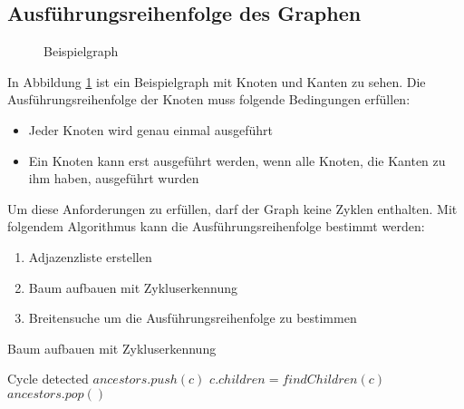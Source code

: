 \subsection{Ausführungsreihenfolge des Graphen}


\begin{figure}[H]
    \centering
    \caption{Beispielgraph}
    \label{fig:nodeExecutionOrder1}
\end{figure}

In Abbildung \ref{fig:nodeExecutionOrder1} ist ein Beispielgraph mit Knoten und Kanten zu sehen. Die Ausführungsreihenfolge der Knoten muss folgende Bedingungen erfüllen:
\begin{itemize}
    \item Jeder Knoten wird genau einmal ausgeführt
    \item Ein Knoten kann erst ausgeführt werden, wenn alle Knoten, die Kanten zu ihm haben, ausgeführt wurden
\end{itemize}

Um diese Anforderungen zu erfüllen, darf der Graph keine Zyklen enthalten. Mit folgendem Algorithmus kann die Ausführungsreihenfolge bestimmt werden:
\begin{enumerate}
    \item Adjazenzliste erstellen
    \item Baum aufbauen mit Zykluserkennung
    \item Breitensuche um die Ausführungsreihenfolge zu bestimmen 
\end{enumerate}

\begin{algorithm}[H]
    \caption{Baum aufbauen mit Zykluserkennung}
    \begin{algorithmic}[1]
                    \State Cycle detected
                \EndIf
                \State $ancestors.push(c)$
                \State $c.children = findChildren(c)$
                \State {}
                \State $ancestors.pop()$
            \EndFor
        \EndFunction
    \end{algorithmic}
\end{algorithm}

